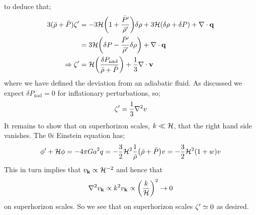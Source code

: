 to deduce that;
\begin{align*}
3(\bar{\rho} + \bar{P})\zeta\pr &= -3\hamilt\left(1 + \frac{\bar{P}\pr}{\bar{\rho}\pr}\right)\delta \rho + 3\hamilt(\delta \rho + \delta P) + \nabla\cdot\vec{q} \\
&= 3\hamilt\left(\delta P - \frac{\bar{P}\pr}{\bar{\rho}\pr}\delta \rho\right) + \nabla\cdot\vec{q} \\
\Rightarrow \zeta\pr &= \hamilt\left(\frac{\delta P_{\text{nad}}}{\bar{\rho} + \bar{P}}\right) + \frac{1}{3}\nabla\cdot\vec{v}
\end{align*}
where we have defined the deviation from an adiabatic fluid. As discussed we expect $\delta P_{\text{nad}} = 0$ for inflationary perturbations, so;
\begin{equation*}
\zeta^{\prime} = \frac{1}{3}\nabla^2 v
\end{equation*}
It remains to show that on superhorizon scales, $k \ll \mathcal{H}$, that the right hand side vanishes. The $0i$ Einstein equation has;
\begin{equation*}
\phi\pr + \hamilt \phi = -4\pi G a^2 q = -\frac{3}{2}\hamilt^2 \frac{1}{\bar{\rho}}\left(\bar{\rho} + \bar{P}\right)v = -\frac{3}{2}\hamilt^2(1 + w)v
\end{equation*}
This in turn implies that $v_{\mathbf{k}} \propto \mathcal{H}^{-2}$ and hence that 
\begin{equation*}
\nabla^2 v_{\vec{k}} \propto k^2 v_{\vec{k}} \propto \left(\frac{k}{\hamilt}\right)^2 \rightarrow 0
\end{equation*} 
on superhorizon scales. So we see that on superhorizon scales $\zeta^{\prime} \simeq 0$ as desired.















